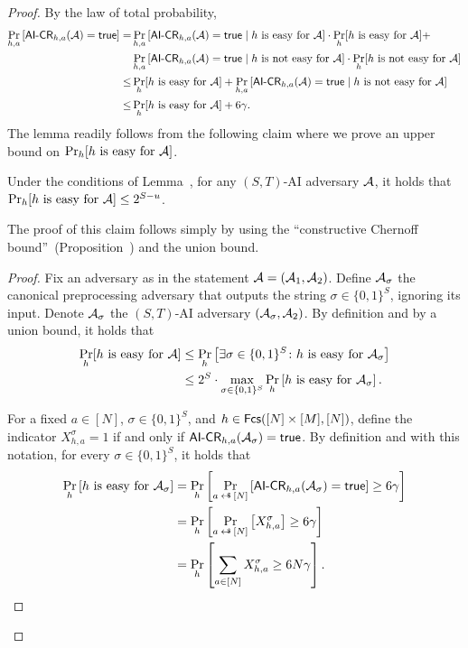 {\begin{proof}
By the law of total probability, 
\begin{align*}
\Pr_{h,a}\left[{{\mathsf{AI}\mbox{-}\mathsf{CR}}_{h,a}(\mathcal{A})}=\mathsf{true}\right] =& \Pr_{h,a}\left[{{\mathsf{AI}\mbox{-}\mathsf{CR}}_{h,a}(\mathcal{A})=\mathsf{true}} \mid h\text{ is easy for }\mathcal{A}\right]\cdot  \Pr_h[h\text{ is easy for }\mathcal{A}] +\\&  \Pr_{h,a}\left[{{\mathsf{AI}\mbox{-}\mathsf{CR}}_{h,a}(\mathcal{A}) = \mathsf{true}} \mid h\text{ is not easy for }\mathcal{A}\right]\cdot \Pr_h[h\text{ is not easy for }\mathcal{A}] \\ 
\le & \Pr_h[h\text{ is easy for }\mathcal{A}] + \Pr_{h,a}\left[{{\mathsf{AI}\mbox{-}\mathsf{CR}}_{h,a}(\mathcal{A}) = \mathsf{true}} \mid h\text{ is not easy for } \mathcal{A}\right] \\ \le & \Pr_h[h\text{ is easy for }\mathcal{A}] + 6\gamma.
\end{align*}
The lemma readily follows from the following claim where we prove an upper bound on $\Pr_h[h\text{ is easy for }\mathcal{A}]$.
\begin{myclaim}
  Under the conditions of Lemma~, for any $(S,T)$-AI adversary $\mathcal{A}$, it holds that $\Pr_h[h\text{ is easy for }\mathcal{A}] \le 2^{S-u}$.
\end{myclaim}
The proof of this claim follows simply by using the ``constructive Chernoff bound''~(Proposition~) and the union bound.
\begin{proof}
Fix an adversary as in the statement $\mathcal{A} = (\mathcal{A}_1,\mathcal{A}_2)$. Define $\mathcal{A}_\sigma$ the canonical preprocessing adversary that outputs the string $\sigma\in \{0,1\}^S$, ignoring its input. Denote $\mathcal{A}_\sigma$ the $(S,T)$-AI adversary $(\mathcal{A}_\sigma,\mathcal{A}_2)$. By definition and by a union bound, it holds that  
\begin{align}
\Pr_h[ h\text{ is easy for }\mathcal{A} ] &\le \Pr_h\left[ \exists \sigma\in \{0,1\}^S \colon h\text{ is easy for } \mathcal{A}_\sigma \right] \nonumber\\
& \le 2^S \cdot \max_{\sigma\in \{0,1\}^S}  \Pr_h\left[h\text{ is easy for } \mathcal{A}_\sigma \right].\label{eq:lemma1:unionbound}
\end{align}

For a fixed $a\in [N]$, $\sigma\in\{0,1\}^S$, and  $h \in \mathsf{Fcs}([N]\times [M],[N])$, define the indicator $X_{h,a}^\sigma=1$ if and only if ${\mathsf{AI}\mbox{-}\mathsf{CR}}_{h,a}(\mathcal{A}_\sigma) = \mathsf{true}$. By definition and with this notation,  for every $\sigma\in \{0,1\}^S$, it holds that
\begin{align}
\Pr_h\left[h\text{ is easy for } \advA_\sigma \right] & =   \Pr_{h}\left[\Pr_{a\getsr [N]} \left[\AICR_{h,a}(\advA_{{\sigma}}) =\true\right]   \geq 6\gamma\right] \nonumber\\&
   = \Pr_{h}\left[\Pr_{a\getsr [N]} \left[X^\sigma_{h,a}\right]\geq 6\gamma\right] \nonumber\\ 
  & = \Pr_{h}\left[\sum_{a\in [N]}X^\sigma_{h,a}\geq 6N\gamma\right].\label{eq:lemma1:sumbound}
\end{align}


\end{proof}
\end{proof}}
